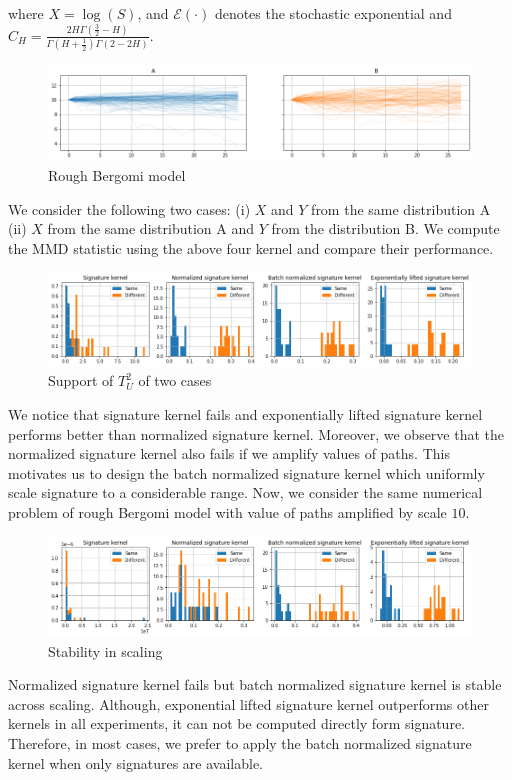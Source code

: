 \documentclass[12pt]{report}
\theoremstyle{definition}
\theoremstyle{remark}
\begin{document}
where $X = \log(S)$, and $\mathcal{E}(\cdot)$ denotes the stochastic exponential and $C_{H} = \frac{2 H \Gamma(\frac{3}{2} - H)}{\Gamma(H+\frac{1}{2})\Gamma(2 - 2H)}$. 
 \begin{figure}[H]
    \centering
    \includegraphics[width=\textwidth]{figs/estimation3.png}
    \caption{Rough Bergomi model}
\end{figure}
We consider the following two cases: (i) $X$ and $Y$ from the same distribution A (ii) $X$ from the same distribution A and $Y$ from the distribution B. We compute the MMD statistic using the above four kernel and compare their performance.
 \begin{figure}[H]
    \centering
    \includegraphics[width=\textwidth]{figs/estimation4.png}
    \caption{Support of $T_{U}^{2}$ of two cases}
\end{figure}
We notice that signature kernel fails and exponentially lifted signature kernel performs better than normalized signature kernel. Moreover, we observe that the normalized signature kernel also fails if we amplify values of paths. This motivates us to design the batch normalized signature kernel which uniformly scale signature to a considerable range. Now, we consider the same numerical problem of rough Bergomi model with value of paths amplified by scale $10$.
 \begin{figure}[H]
    \centering
    \includegraphics[width=\textwidth]{figs/estimation5.png}
    \caption{Stability in scaling}
\end{figure}
Normalized signature kernel fails but batch normalized signature kernel is stable across scaling. Although, exponential lifted signature kernel outperforms other kernels in all experiments, it can not be computed directly form signature. Therefore, in most cases, we prefer to apply the batch normalized signature kernel when only signatures are available. 
\end{document}
